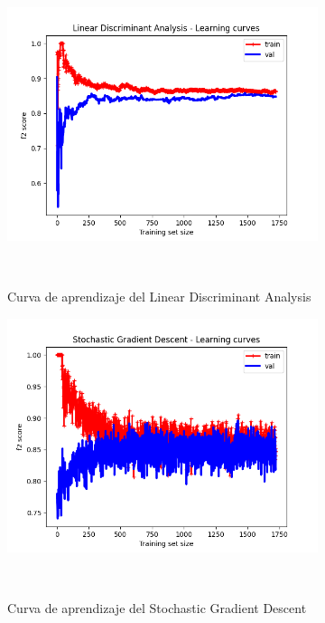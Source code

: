 \begin{figure}[!ht]
\begin{subfigure}[b]{0.3\textwidth}
        \includegraphics[width=\linewidth]{media/images/learning-curves/lda.png}
        \caption{Curva de aprendizaje del Linear Discriminant Analysis}\ \label{sfig:lc-lda}
    \end{subfigure}
    \begin{subfigure}[b]{0.3\textwidth}
        \includegraphics[width=\linewidth]{media/images/learning-curves/sgd.png}
        \caption{Curva de aprendizaje del Stochastic Gradient Descent}\ \label{sfig:lc-sgd}
    \end{subfigure}
    \begin{subfigure}[b]{0.3\textwidth}

\end{subfigure}
\end{figure}
